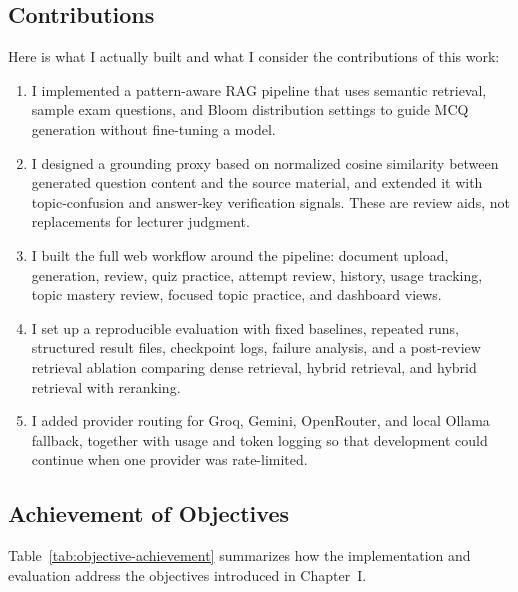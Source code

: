 \documentclass[12pt,a4paper]{article}
\begin{document}
\subsection{Contributions}

Here is what I actually built and what I consider the contributions of this
work:

\begin{enumerate}
  \item I implemented a pattern-aware RAG pipeline that uses semantic
        retrieval, sample exam questions, and Bloom distribution settings
        to guide MCQ generation without fine-tuning a model.
  \item I designed a grounding proxy based on normalized cosine similarity
        between generated question content and the source material, and
        extended it with topic-confusion and answer-key verification signals.
        These are review aids, not replacements for lecturer judgment.
  \item I built the full web workflow around the pipeline: document upload,
        generation, review, quiz practice, attempt review, history, usage
        tracking, topic mastery review, focused topic practice, and
        dashboard views.
  \item I set up a reproducible evaluation with fixed baselines, repeated
        runs, structured result files, checkpoint logs, failure analysis, and
        a post-review retrieval ablation comparing dense retrieval, hybrid
        retrieval, and hybrid retrieval with reranking.
  \item I added provider routing for Groq, Gemini, OpenRouter, and local
        Ollama fallback, together with usage and token logging so that
        development could continue when one provider was rate-limited.
\end{enumerate}

\subsection{Achievement of Objectives}

Table~\ref{tab:objective-achievement} summarizes how the implementation and
evaluation address the objectives introduced in Chapter~I.
\end{document}
